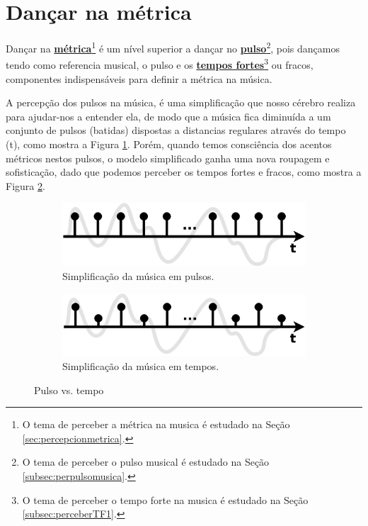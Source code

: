 
\newpage
\section{Dançar na métrica}
\label{subsec:dancametrica}
Dançar na \hyperref[sec:percepcionmetrica]{\textbf{métrica}}\footnote{O 
tema de perceber a métrica na musica é estudado na Seção 
\ref{sec:percepcionmetrica}.} 
é um nível superior a dançar no \hyperref[subsec:perpulsomusica]{\textbf{pulso}}\footnote{O 
tema de perceber o pulso musical é estudado na Seção \ref{subsec:perpulsomusica}.},
pois dançamos tendo como referencia musical, o pulso
e os \hyperref[subsec:perceberTF1]{\textbf{tempos fortes}}\footnote{O 
tema de perceber o tempo forte na musica é estudado na Seção 
\ref{subsec:perceberTF1}.}  ou fracos,
componentes indispensáveis para definir a métrica na música.

A percepção dos pulsos na música, 
é uma simplificação que nosso cérebro realiza para ajudar-nos a entender ela,
de modo que a música fica diminuída a um conjunto de pulsos (batidas) dispostas
a distancias regulares através do tempo (t), como mostra a Figura \ref{fig:metrica:pulso}.
Porém, quando temos consciência dos acentos métricos nestos pulsos,
o modelo simplificado ganha uma nova roupagem e sofisticação, 
dado que podemos perceber os tempos fortes e fracos, como mostra a Figura \ref{fig:metrica:tempo}.
\begin{figure}[!h]
     \centering
     \begin{subfigure}[b]{0.485\textwidth}
         \centering
         \includegraphics[width=\textwidth]{chapters/cap-musicalidade-tecnica/aspectos-metrica-a.eps}
         \caption{Simplificação da música em pulsos.}
         \label{fig:metrica:pulso}
     \end{subfigure}
     \hfill
     \begin{subfigure}[b]{0.485\textwidth}
         \centering
         \includegraphics[width=\textwidth]{chapters/cap-musicalidade-tecnica/aspectos-metrica-b.eps}
         \caption{Simplificação da música em tempos.}
         \label{fig:metrica:tempo}
     \end{subfigure}
        \caption{Pulso vs. tempo}
        \label{fig:metricapulsotempo}
\end{figure}


